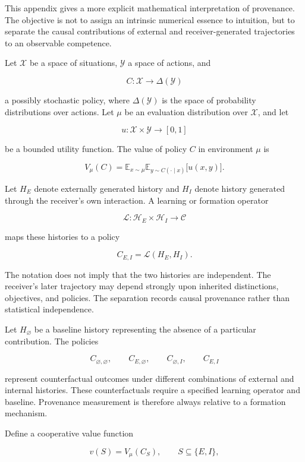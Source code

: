 \documentclass[11pt]{article}
\begin{document}
This appendix gives a more explicit mathematical interpretation of provenance. The objective is not to assign an intrinsic numerical essence to intuition, but to separate the causal contributions of external and receiver-generated trajectories to an observable competence.

Let $\mathcal{X}$ be a space of situations, $\mathcal{Y}$ a space of actions, and

\[
C : \mathcal{X} \to \Delta(\mathcal{Y})
\]

a possibly stochastic policy, where $\Delta(\mathcal{Y})$ is the space of probability distributions over actions. Let $\mu$ be an evaluation distribution over $\mathcal{X}$, and let

\[
u : \mathcal{X}\times\mathcal{Y}\to[0,1]
\]

be a bounded utility function. The value of policy $C$ in environment $\mu$ is

\[
V_{\mu}(C)
=
\mathbb{E}_{x\sim\mu}
\mathbb{E}_{y\sim C(\cdot\mid x)}
\bigl[u(x,y)\bigr].
\]

Let $H_E$ denote externally generated history and $H_I$ denote history generated through the receiver's own interaction. A learning or formation operator

\[
\mathcal{L} :
\mathcal{H}_E \times \mathcal{H}_I
\to
\mathcal{C}
\]

maps these histories to a policy

\[
C_{E,I}
=
\mathcal{L}(H_E,H_I).
\]

The notation does not imply that the two histories are independent. The receiver's later trajectory may depend strongly upon inherited distinctions, objectives, and policies. The separation records causal provenance rather than statistical independence.

Let $H_{\varnothing}$ be a baseline history representing the absence of a particular contribution. The policies

\[
C_{\varnothing,\varnothing},
\qquad
C_{E,\varnothing},
\qquad
C_{\varnothing,I},
\qquad
C_{E,I}
\]

represent counterfactual outcomes under different combinations of external and internal histories. These counterfactuals require a specified learning operator and baseline. Provenance measurement is therefore always relative to a formation mechanism.

Define a cooperative value function

\[
v(S)
=
V_{\mu}(C_S),
\qquad
S\subseteq\{E,I\},
\]
\end{document}
